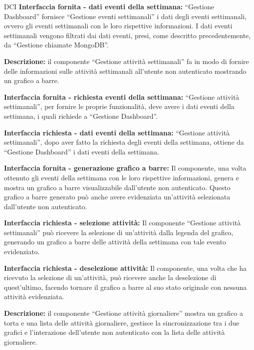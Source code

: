 \begin{listaPersonale}{DCI}
    \textbf{Interfaccia fornita - dati eventi della settimana:} “Gestione Dashboard” fornisce  “Gestione eventi settimanali” i dati degli eventi settimanali, ovvero gli eventi settimanali con le loro rispettive informazioni. I dati eventi settimanali vengono filtrati dai dati eventi, presi, come descritto precedentemente, da “Gestione chiamate MongoDB”.



    \textbf{Descrizione:} il componente “Gestione attività settimanali” fa in modo di fornire delle informazioni sulle attività settimanali all'utente non autenticato mostrando un grafico a barre.

    \textbf{Interfaccia fornita - richiesta eventi della settimana:} “Gestione attività settimanali”, per fornire le proprie funzionalità, deve avere i dati eventi della settimana, i quali richiede a “Gestione Dashboard”.

    \textbf{Interfaccia richiesta - dati eventi della settimana:} “Gestione attività settimanali”, dopo aver fatto la richiesta degli eventi della settimana, ottiene da “Gestione Dashboard” i dati eventi della settimana.

    \textbf{Interfaccia fornita - generazione grafico a barre:} Il componente, una volta ottenuto gli eventi della settimana con le loro rispettive informazioni, genera e mostra un grafico a barre visualizzabile dall'utente non autenticato. Questo grafico a barre generato può anche avere evidenziata un'attività selezionata dall'utente non autenticato.

    \textbf{Interfaccia richiesta - selezione attività:} Il componente “Gestione attività settimanali” può ricevere la selezione di un'attività dalla legenda del grafico, generando un grafico a barre delle attività della settimana con tale evento evidenziato.

    \textbf{Interfaccia richiesta - deselezione attività:} Il componente, una volta che ha ricevuto la selezione di un'attività, può ricevere anche la deselezione di quest'ultimo, facendo tornare il grafico a barre al suo stato originale con nessuna attività evidenziata.



    \textbf{Descrizione:} il componente “Gestione attività giornaliere” mostra un grafico a torta e una lista delle attività giornaliere, gestisce la sincronizzazione tra i due grafici e l'interazione dell'utente non autenticato con la lista delle attività giornaliere.


\end{listaPersonale}
